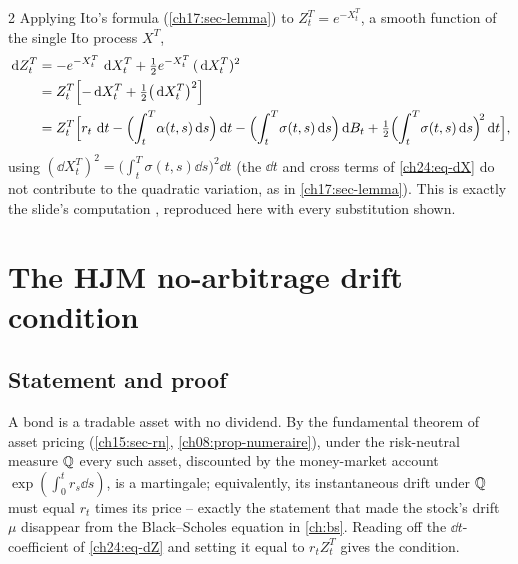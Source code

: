 \begin{paracol}{2}
Applying Ito's formula (\cref{ch17:sec-lemma}) to $Z_t^T=e^{-X_t^T}$, a smooth function of the single Ito process $X^T$,
\begin{align}
  \,\mathrm{d} Z_t^T&=-e^{-X_t^T}\,\,\mathrm{d} X_t^T+\tfrac12e^{-X_t^T}\,(\,\mathrm{d} X_t^T)^2\notag\\
  &=Z_t^T\Bigl[-\,\mathrm{d} X_t^T+\tfrac12\bigl(\,\mathrm{d} X_t^T\bigr)^2\Bigr]\notag\\
  &=Z_t^T\Bigl[r_t\,\,\mathrm{d} t-\Bigl(\int_t^T\!\alpha(t,s)\,\mathrm{d} s\Bigr)\,\mathrm{d} t-\Bigl(\int_t^T\!\sigma(t,s)\,\mathrm{d} s\Bigr)\,\mathrm{d} B_t+\tfrac12\Bigl(\int_t^T\!\sigma(t,s)\,\mathrm{d} s\Bigr)^{\!2}\,\mathrm{d} t\Bigr],\label{ch24:eq-dZ}
\end{align}
using $(\dd X_t^T)^2=\bigl(\int_t^T\sigma(t,s)\dd s\bigr)^2\dd t$ (the $\dd t$ and cross terms of \eqref{ch24:eq-dX} do not contribute to the quadratic variation, as in \cref{ch17:sec-lemma}). This is exactly the slide's computation , reproduced here with every substitution shown.

\section{The HJM no-arbitrage drift condition}\label{ch24:sec-drift}

\subsection{Statement and proof}
A bond is a tradable asset with no dividend. By the fundamental theorem of asset pricing (\cref{ch15:sec-rn}, \cref{ch08:prop-numeraire}), under the risk-neutral measure $\mathbb{Q}$ every such asset, discounted by the money-market account $\exp(\int_0^tr_s\dd s)$, is a martingale; equivalently, its instantaneous drift under $\mathbb{Q}$ must equal $r_t$ times its price -- exactly the statement that made the stock's drift $\mu$ disappear from the Black--Scholes equation in \cref{ch:bs}. Reading off the $\dd t$-coefficient of \eqref{ch24:eq-dZ} and setting it equal to $r_tZ_t^T$ gives the condition.


\end{paracol}
